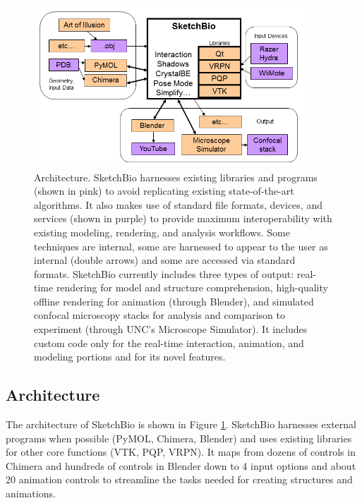 \documentclass[twocolumn]{bmcart}%
\begin{document}
\begin{figure}[ht]
    \begin{center}
    \noindent\includegraphics[width=0.9\textwidth]
    {system_diagram.png}
    \end{center}
\caption{Architecture.
SketchBio harnesses existing libraries and programs (shown in pink) to avoid replicating existing state-of-the-art algorithms.
It also makes use of standard file formats, devices, and services (shown in purple) to provide maximum interoperability with existing modeling, rendering, and analysis workflows.
Some techniques are internal, some are harnessed to appear to the user as internal (double arrows) and some are accessed via standard formats.
SketchBio currently includes three types of output: real-time rendering for model and structure comprehension, high-quality offline rendering for animation (through Blender), and simulated confocal microscopy stacks for analysis and comparison to experiment (through UNC's Microscope Simulator).
It includes custom code only for the real-time interaction, animation, and modeling portions and for its novel features.}
\label{fig:architecture}
\end{figure}

\subsection*{Architecture}

The architecture of SketchBio is shown in Figure \ref{fig:architecture}.
SketchBio harnesses external programs when possible (PyMOL, Chimera, Blender) and uses existing libraries for other core functions (VTK, PQP, VRPN).
It maps from dozens of controls in Chimera and hundreds of controls in Blender down to 4 input options and about 20 animation controls to streamline the tasks needed for creating structures and animations.
\end{document}
